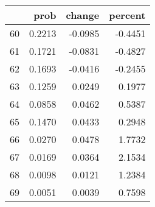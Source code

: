 \begin{tabular}{lrrr}
\toprule
{} &    prob &  change &  percent \\
\midrule
60 &  0.2213 & -0.0985 &  -0.4451 \\
61 &  0.1721 & -0.0831 &  -0.4827 \\
62 &  0.1693 & -0.0416 &  -0.2455 \\
63 &  0.1259 &  0.0249 &   0.1977 \\
64 &  0.0858 &  0.0462 &   0.5387 \\
65 &  0.1470 &  0.0433 &   0.2948 \\
66 &  0.0270 &  0.0478 &   1.7732 \\
67 &  0.0169 &  0.0364 &   2.1534 \\
68 &  0.0098 &  0.0121 &   1.2384 \\
69 &  0.0051 &  0.0039 &   0.7598 \\
\bottomrule
\end{tabular}
